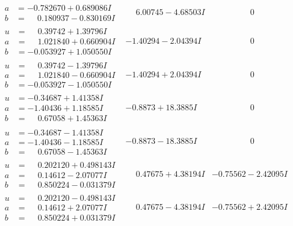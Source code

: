 \documentclass[1p]{elsarticle_modified}
\theoremstyle{definition}
\begin{document}
$$\begin{array}{c|c|c}
\begin{aligned}
a &= -0.782670 + 0.689086 I \\
b &= \phantom{-}0.180937 - 0.830169 I\end{aligned}
 & \phantom{-}6.00745 - 4.68503 I & \phantom{-0.000000 } 0 \\ \hline\begin{aligned}
u &= \phantom{-}0.39742 + 1.39796 I \\
a &= \phantom{-}1.021840 + 0.660904 I \\
b &= -0.053927 + 1.050550 I\end{aligned}
 & -1.40294 - 2.04394 I & \phantom{-0.000000 } 0 \\ \hline\begin{aligned}
u &= \phantom{-}0.39742 - 1.39796 I \\
a &= \phantom{-}1.021840 - 0.660904 I \\
b &= -0.053927 - 1.050550 I\end{aligned}
 & -1.40294 + 2.04394 I & \phantom{-0.000000 } 0 \\ \hline\begin{aligned}
u &= -0.34687 + 1.41358 I \\
a &= -1.40436 + 1.18585 I \\
b &= \phantom{-}0.67058 + 1.45363 I\end{aligned}
 & -0.8873 + 18.3885 I & \phantom{-0.000000 } 0 \\ \hline\begin{aligned}
u &= -0.34687 - 1.41358 I \\
a &= -1.40436 - 1.18585 I \\
b &= \phantom{-}0.67058 - 1.45363 I\end{aligned}
 & -0.8873 - 18.3885 I & \phantom{-0.000000 } 0 \\ \hline\begin{aligned}
u &= \phantom{-}0.202120 + 0.498143 I \\
a &= \phantom{-}0.14612 - 2.07077 I \\
b &= \phantom{-}0.850224 - 0.031379 I\end{aligned}
 & \phantom{-}0.47675 + 4.38194 I & -0.75562 - 2.42095 I \\ \hline\begin{aligned}
u &= \phantom{-}0.202120 - 0.498143 I \\
a &= \phantom{-}0.14612 + 2.07077 I \\
b &= \phantom{-}0.850224 + 0.031379 I\end{aligned}
 & \phantom{-}0.47675 - 4.38194 I & -0.75562 + 2.42095 I \\ \hline\begin{aligned}

\end{aligned}
\end{array}$$
\end{document}
